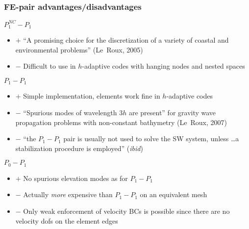 \begin{frame}%
  \frametitle{FE-pair advantages/disadvantages}
  \begin{itemize}%
    {
    \item{
      $P_1^{NC}-P_1$
      \begin{itemize}
	\item {$+$ ``A promising choice for the discretization of a variety
	  of coastal and environmental problems'' (Le~Roux, 2005)}
	\item {$-$ Difficult to use in $h$-adaptive codes with hanging nodes and
	  nested spaces}
      \end{itemize}
      }
      }
    {
    \item{
      $P_1-P_1$
      \begin{itemize}
	\item {$+$ Simple implementation, elements work fine in $h$-adaptive codes}
	\item {$-$ ``Spurious modes of wavelength $3h$ are present'' for gravity
	  wave propagation problems with non-constant bathymetry (Le~Roux, 2007)}
	\item{$-$ ``the $P_1-P_1$ pair is usually not used to solve the SW system, unless
	  \ldots a stabilization procedure is employed'' (\emph{ibid})}
      \end{itemize}
      }
      }
    {
    \item{
      $P_0-P_1$
      \begin{itemize}
	\item {$+$ No spurious elevation modes as for $P_1-P_1$}
	\item {$-$ Actually \emph{more} expensive than $P_1-P_1$ on an equivalent mesh}
	\item {$-$ Only weak enforcement of velocity BCs is possible since there are no
	  velocity dofs on the element edges}
      \end{itemize}
      }
      }
  \end{itemize}
\end{frame}
